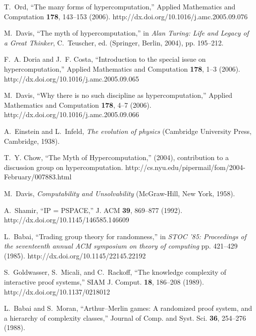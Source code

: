 \documentclass[12pt]{article}
\begin{document}
\begin{thebibliography}{10}
T.~Ord, \enquote{The many forms of hypercomputation,} Applied Mathematics and
  Computation {\bf 178}, 143--153 (2006).
\newline http://dx.doi.org/10.1016/j.amc.2005.09.076

M.~Davis, \enquote{The myth of hypercomputation,} in {\em Alan Turing: Life and
  Legacy of a Great Thinker\/}, C.~Teuscher, ed.  (Springer, Berlin, 2004), pp.
  195--212.

F.~A. Doria and J.~F. Costa, \enquote{Introduction to the special issue on
  hypercomputation,} Applied Mathematics and Computation {\bf 178}, 1--3
  (2006).
\newline http://dx.doi.org/10.1016/j.amc.2005.09.065

M.~Davis, \enquote{Why there is no such discipline as hypercomputation,}
  Applied Mathematics and Computation {\bf 178}, 4--7 (2006).
\newline http://dx.doi.org/10.1016/j.amc.2005.09.066

A.~Einstein and L.~Infeld, {\em The evolution of physics\/} (Cambridge
  University Press, Cambridge, 1938).

T.~Y. Chow, \enquote{The Myth of Hypercomputation,}  (2004), contribution to a
  discussion group on hypercomputation.
\newline http://cs.nyu.edu/pipermail/fom/2004-February/007883.html

M.~Davis, {\em Computability and Unsolvability\/} (McGraw-Hill, New York,
  1958).

A.~Shamir, \enquote{IP = PSPACE,} J. ACM {\bf 39}, 869--877 (1992).
\newline http://dx.doi.org/10.1145/146585.146609

L.~Babai, \enquote{Trading group theory for randomness,} in {\em STOC '85:
  Proceedings of the seventeenth annual ACM symposium on theory of computing\/}
   pp. 421--429 (1985).
\newline http://dx.doi.org/10.1145/22145.22192

S.~Goldwasser, S.~Micali, and C.~Rackoff, \enquote{The knowledge complexity of
  interactive proof systems,} SIAM J. Comput. {\bf 18}, 186--208 (1989).
\newline http://dx.doi.org/10.1137/0218012

L.~Babai and S.~Moran, \enquote{Arthur--Merlin games: A randomized proof
  system, and a hierarchy of complexity classes,} Journal of Comp. and Syst.
  Sci. {\bf 36}, 254--276 (1988).


\end{thebibliography}
\end{document}
